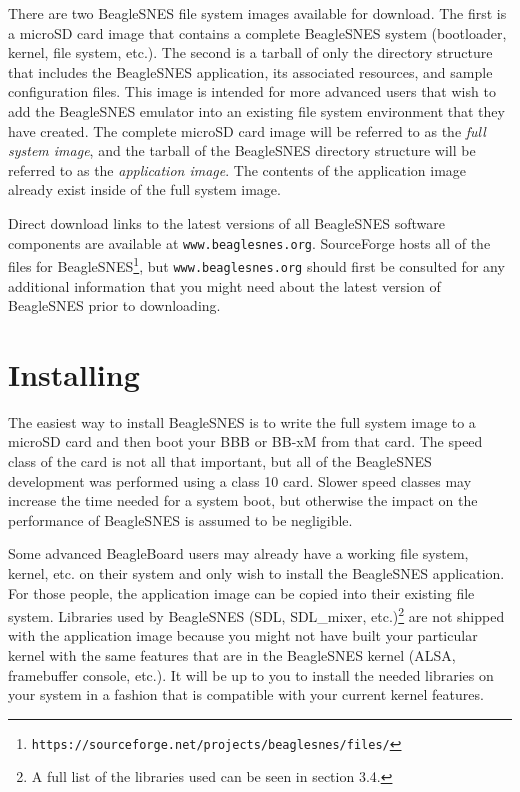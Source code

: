 There are two BeagleSNES file system images available for download. The first is a microSD card image that contains a complete BeagleSNES system (bootloader, kernel, file system, etc.).  The second is a tarball of only the directory structure that includes the BeagleSNES application, its associated resources, and sample configuration files.  This image is intended for more advanced users that wish to add the BeagleSNES emulator into an existing file system environment that they have created.  The complete microSD card image will be referred to as the \emph{full system image}, and the tarball of the BeagleSNES directory structure will be referred to as the \emph{application image}.  The contents of the application image already exist inside of the full system image.

Direct download links to the latest versions of all BeagleSNES software components are available at \texttt{www.beaglesnes.org}.  SourceForge hosts all of the files for BeagleSNES\footnote{\texttt{https://sourceforge.net/projects/beaglesnes/files/}}, but \texttt{www.beaglesnes.org} should first be consulted for any additional information that you might need about the latest version of BeagleSNES prior to downloading. 

\section{Installing}

The easiest way to install BeagleSNES is to write the full system image to a microSD card and then boot your BBB or BB-xM from that card. The speed class of the card is not all that important, but all of the BeagleSNES development was performed using a class 10 card. Slower speed classes may increase the time needed for a system boot, but otherwise the impact on the performance of BeagleSNES is assumed to be negligible.

Some advanced BeagleBoard users may already have a working file system, kernel, etc. on their system and only wish to install the BeagleSNES application. For those people, the application image can be copied into their existing file system. Libraries used by BeagleSNES (SDL, SDL\_mixer, etc.)\footnote{A full list of the libraries used can be seen in section 3.4.} are not shipped with the application image because you might not have built your particular kernel with the same features that are in the BeagleSNES kernel (ALSA, framebuffer console, etc.). It will be up to you to install the needed libraries on your system in a fashion that is compatible with your current kernel features. 

